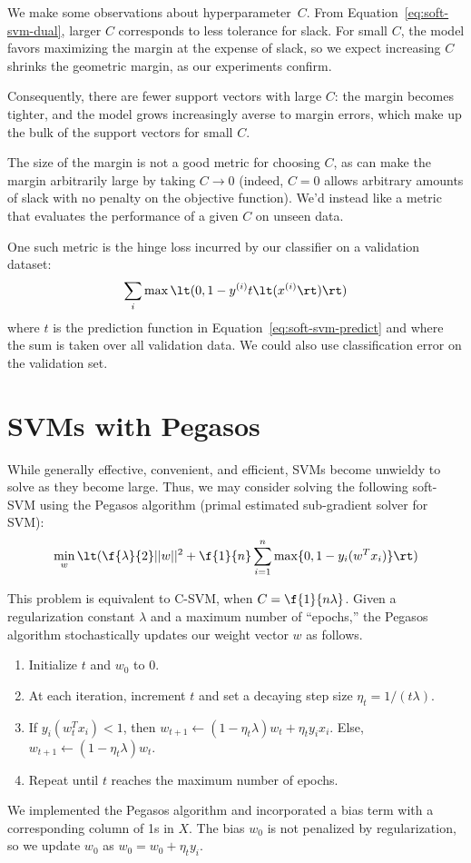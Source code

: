 \documentclass{article}
\newcommand{\sind}[1]{^{(#1)}}
\begin{document}
\begin{multicols}{2}
We make some observations about hyperparameter~$C$.
From Equation~\ref{eq:soft-svm-dual},
larger $C$ corresponds to less tolerance for slack.
For small $C$, the model favors
maximizing the margin at the expense of slack,
so we expect increasing $C$ shrinks the geometric margin,
as our experiments confirm.

Consequently, there are fewer support vectors with large $C$:
the margin becomes tighter,
and the model grows increasingly averse to margin errors,
which make up the bulk of the support vectors for small $C$.

The size of the margin
is not a good metric for choosing $C$,
as can make the margin arbitrarily large
by taking $C \to 0$
(indeed, $C = 0$ allows arbitrary amounts of slack
with no penalty on the objective function).
We'd instead like a metric that evaluates
the performance of a given $C$
on unseen data.

One such metric is the hinge loss incurred
by our classifier on a validation dataset:
\begin{equation}
    \sum_{i} \max\lt(0, 1 - y\sind{i} t\lt(x\sind{i}\rt)\rt)
\end{equation}
where $t$ is the prediction function in Equation~\ref{eq:soft-svm-predict}
and where the sum is taken over all validation data.
We could also use classification error on the validation set.



\section{SVMs with Pegasos}

While generally effective, convenient, and efficient,
SVMs become unwieldy to solve as they become large.
Thus, we may consider solving the following soft-SVM
using the Pegasos algorithm
(primal estimated sub-gradient solver for SVM):
\begin{equation}
   \min_w \lt( \f{\lambda}{2}||w||^2 + \f{1}{n}\sum_{i=1}^n{\max\{0,1-y_i(w^Tx_i)\}} \rt)
\end{equation}

This problem is equivalent to C-SVM, when $C= \f{1}{n\lambda}$. Given a regularization constant $\lambda$ and a maximum number of ``epochs,'' the Pegasos algorithm stochastically updates our weight vector $w$ as follows.
\begin{enumerate}
\item Initialize $t$ and $w_0$ to 0.
\item At each iteration, increment $t$ and set a decaying step size $\eta_t = 1/(t\lambda)$.
\item If $y_i(w_t^Tx_i)<1$, then $w_{t+1}\leftarrow(1-\eta_t\lambda)w_t+\eta_ty_ix_i$. Else,  $w_{t+1}\leftarrow(1-\eta_t\lambda)w_t$.
\item Repeat until $t$ reaches the maximum number of epochs.
\end{enumerate}
We implemented the Pegasos algorithm and incorporated a bias term with a corresponding column of 1s in $X$. The bias $w_0$ is not penalized by regularization, so we update $w_0$ as $w_0 = w_0 + \eta_t y_i$.


\end{multicols}
\end{document}
